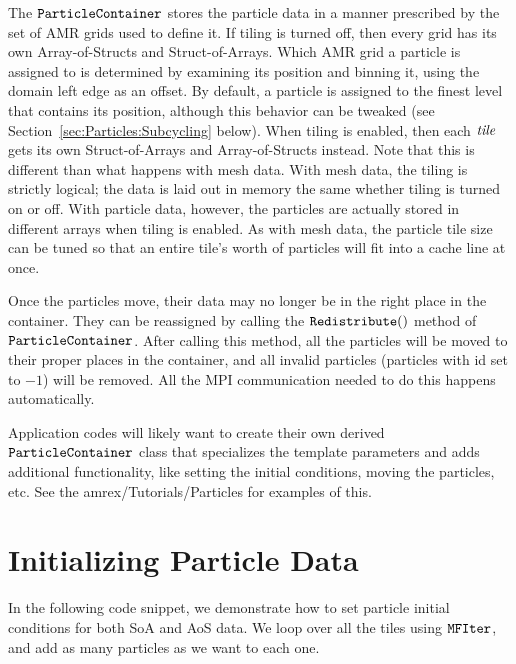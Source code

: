 The $\tt{ParticleContainer}$ stores the particle data in a manner prescribed by the set of AMR grids used to define it. If tiling is turned off, then every grid has its own 
Array-of-Structs and Struct-of-Arrays. Which AMR grid a particle is assigned to is determined by examining its position and binning it, using the domain left edge as an offset. 
By default, a particle is assigned to the finest level that contains its position, although this behavior can be tweaked (see Section~\ref{sec:Particles:Subcycling} below). 
When tiling is enabled, then each $\emph{tile}$ gets its own Struct-of-Arrays and Array-of-Structs instead. Note that this is different than what happens with mesh data. With mesh
data, the tiling is strictly logical; the data is laid out in memory the same whether tiling is turned on or off. With particle data, however, the particles are actually stored in 
different arrays when tiling is enabled. As with mesh data, the particle tile size can be tuned so that an entire tile's worth of particles will fit into a cache line at once.

Once the particles move, their data may no longer be in the right place in the container. They can be reassigned by calling the $\tt{Redistribute()}$ method of $\tt{ParticleContainer}$.
After calling this method, all the particles will be moved to their proper places in the container, and all invalid particles (particles with id set to $-1$) will be removed. All the 
MPI communication needed to do this happens automatically.

Application codes will likely want to create their own derived $\tt{ParticleContainer}$ class that specializes the template parameters and adds additional 
functionality, like setting the initial conditions, moving the particles, etc. See the amrex/Tutorials/Particles for examples of this.

\section{Initializing Particle Data}
\label{sec:Particles:Initializing}

In the following code snippet, we demonstrate how to set particle initial conditions for both SoA and AoS data. We loop over all the tiles using $\tt{MFIter}$, and add
as many particles as we want to each one.

